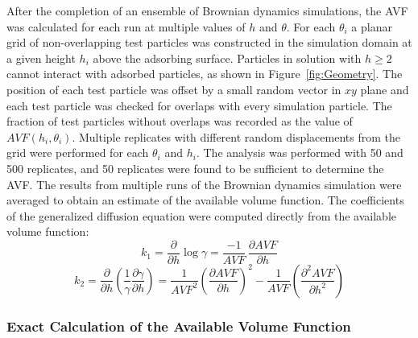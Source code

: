 After the completion of an ensemble of Brownian dynamics simulations,
the AVF was calculated for each run at multiple values of $h$ and
$\theta$. For each $\theta_{i}$ a planar grid of non-overlapping
test particles was constructed in the simulation domain at a given
height $h_{i}$ above the adsorbing surface. Particles in solution
with $h\geq2$ cannot interact with adsorbed particles, as shown in
Figure~\ref{fig:Geometry}. The position of each test particle was
offset by a small random vector in $xy$ plane and each test particle
was checked for overlaps with every simulation particle. The fraction
of test particles without overlaps was recorded as the value of $AVF\left(h_{i},\theta_{i}\right)$.
Multiple replicates with different random displacements from the grid
were performed for each $\theta_{i}$ and $h_{i}$. The analysis was
performed with 50 and 500 replicates, and 50 replicates were found
to be sufficient to determine the AVF. The results from multiple runs
of the Brownian dynamics simulation were averaged to obtain an estimate
of the available volume function. The coefficients of the generalized
diffusion equation were computed directly from the available volume
function:\[
k_{1}=\frac{\partial}{\partial h}\log\gamma=\frac{-1}{AVF}\,\frac{\partial AVF}{\partial h}\]
\[
k_{2}=\frac{\partial}{\partial h}\left(\frac{1}{\gamma}\frac{\partial\gamma}{\partial h}\right)=\frac{1}{AVF^{2}}\left(\frac{\partial AVF}{\partial h}\right)^{2}-\frac{1}{AVF}\left(\frac{\partial^{2}AVF}{\partial h^{2}}\right)\]



\subsubsection{Exact Calculation of the Available Volume Function}

